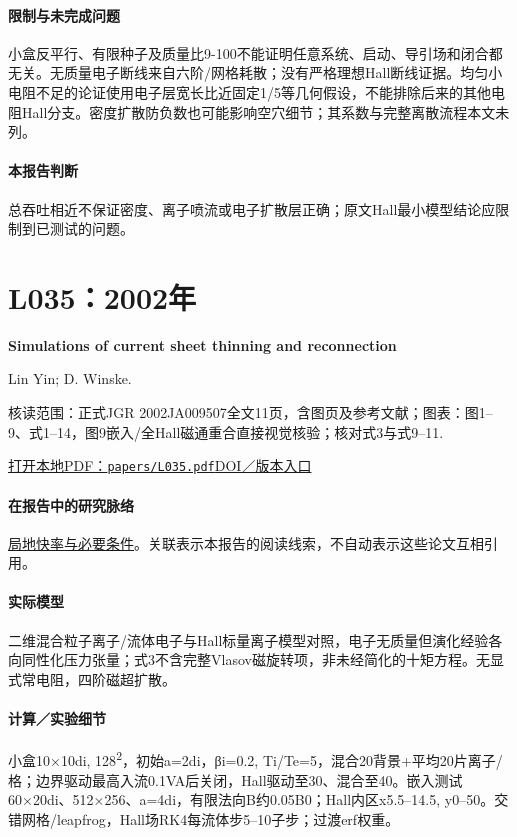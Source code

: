\paragraph{限制与未完成问题}小盒反平行、有限种子及质量比9-100不能证明任意系统、启动、导引场和闭合都无关。无质量电子断线来自六阶/网格耗散；没有严格理想Hall断线证据。均匀小电阻不足的论证使用电子层宽长比近固定1/5等几何假设，不能排除后来的其他电阻Hall分支。密度扩散防负数也可能影响空穴细节；其系数与完整离散流程本文未列。

\paragraph{本报告判断}总吞吐相近不保证密度、离子喷流或电子扩散层正确；原文Hall最小模型结论应限制到已测试的问题。

\section{L035：2002年}\label{paper:L035}

\textbf{Simulations of current sheet thinning and reconnection}\citep{L035}\

Lin Yin;  D. Winske.

\textsf{核读范围：}正式JGR 2002JA009507全文11页，含图页及参考文献；\textsf{图表：}图1–9、式1–14，图9嵌入/全Hall磁通重合直接视觉核验；核对式3与式9–11.

\href{run:papers/L035.pdf}{打开本地PDF：\texttt{papers/L035.pdf}}\quad\href{https://doi.org/10.1029/2002ja009507}{DOI／版本入口}

\paragraph{在报告中的研究脉络}\hyperref[story:fast]{局地快率与必要条件}。关联表示本报告的阅读线索，不自动表示这些论文互相引用。

\paragraph{实际模型}二维混合粒子离子/流体电子与Hall标量离子模型对照，电子无质量但演化经验各向同性化压力张量；式3不含完整Vlasov磁旋转项，非未经简化的十矩方程。无显式常电阻，四阶磁超扩散。

\paragraph{计算／实验细节}小盒10×10di, 128\textsuperscript{2}，初始a=2di，βi=0.2, Ti/Te=5，混合20背景+平均20片离子/格；边界驱动最高入流0.1VA后关闭，Hall驱动至30、混合至40。嵌入测试60×20di、512×256、a=4di，有限法向B约0.05B0；Hall内区x5.5–14.5, y0–50。交错网格/leapfrog，Hall场RK4每流体步5–10子步；过渡erf权重。

